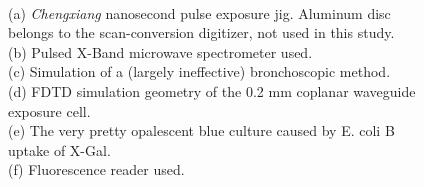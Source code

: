 \documentclass[paper.tex]{subfiles}
\begin{document}



\begin{figure}[H]
\captionsetup{singlelinecheck = false, justification=justified}
	\centering
	
    \hfill
    \hfill


	\caption*{\small{\\
	(a) \textit{Chengxiang} nanosecond pulse exposure jig. Aluminum disc belongs to the scan-conversion digitizer, not used in this study.\\
	(b) Pulsed X-Band microwave spectrometer used.\\
	(c) Simulation of a (largely ineffective) bronchoscopic method.\\
	(d) FDTD simulation geometry of the 0.2 mm coplanar waveguide exposure cell.\\
	(e)	The very pretty opalescent blue culture caused by E. coli B uptake of X-Gal.\\
	(f) Fluorescence reader used.\\
}}
\end{figure}
\clearpage
\end{document}
